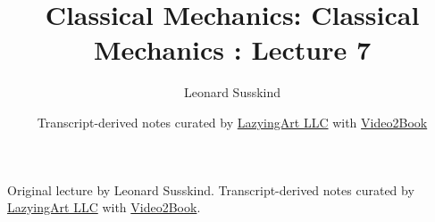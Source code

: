 \documentclass[11pt,oneside]{book}
\begin{document}
\frontmatter
\title{Classical Mechanics: Classical Mechanics : Lecture 7}
\author{Leonard Susskind}
\date{Transcript-derived notes curated by \href{https://lazying.art}{LazyingArt LLC} with \href{https://github.com/lachlanchen/Video2Book}{Video2Book}}
\maketitle
\begin{center}
\small Original lecture by Leonard Susskind. Transcript-derived notes curated by \href{https://lazying.art}{LazyingArt LLC} with \href{https://github.com/lachlanchen/Video2Book}{Video2Book}.
\end{center}
\clearpage
\mainmatter

\end{document}
